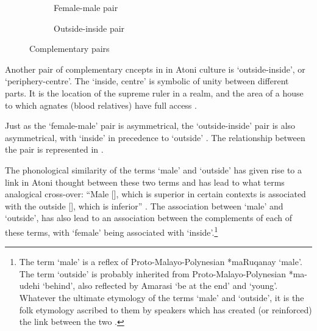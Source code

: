 \begin{figure}
  \begin{subfigure}[b]{0.49\textwidth}
		\caption{Female-male pair}\label{fig:FemMasRel}
  \end{subfigure}
  \begin{subfigure}[b]{0.49\textwidth}
		\caption{Outside-inside pair}\label{fig:OutIns}
  \end{subfigure}
	\caption{Complementary pairs}\label{fig:CompPai}
\end{figure}

Another pair of complementary cncepts in in Atoni culture
is  `outside-inside', or `periphery-centre'.
The  `inside, centre' is symbolic of unity between different parts.
It is the location of the supreme ruler in a realm,
and the area of a house to which agnates
(blood relatives) have full access \citep{cu64}.

Just as the  `female-male' pair is asymmetrical,
the  `outside-inside' pair is also asymmetrical,
with  `inside' in precedence to
 `outside' \citep{cu64,scno71,fo89}.
The relationship between the pair 
is represented in .

The phonological similarity of the terms  `male'
and  `outside' has given rise to a link in Atoni thought
between these two terms and has lead to what \cite{fo89} terms analogical cross-over:
``Male [], which is superior in certain contexts
is associated with the outside [], which is inferior'' \cite[49]{fo89}.
The association between  `male' and  `outside',
has also lead to an association between the complements of each of these terms,
with  `female' being associated with  `inside'.\footnote{
		The term  `male' is a reflex of Proto-Malayo-Polynesian *maRuqanay `male'.
		The term  `outside' is probably
		inherited from Proto-Malayo-Polynesian *ma-udehi `behind',
		also reflected by Amarasi  `be at the end' and  `young'.
		Whatever the ultimate etymology of the terms  `male' and  `outside',
		it is the folk etymology ascribed to them by speakers
		which has created (or reinforced) the link between the two \citep[49]{fo89}.}

